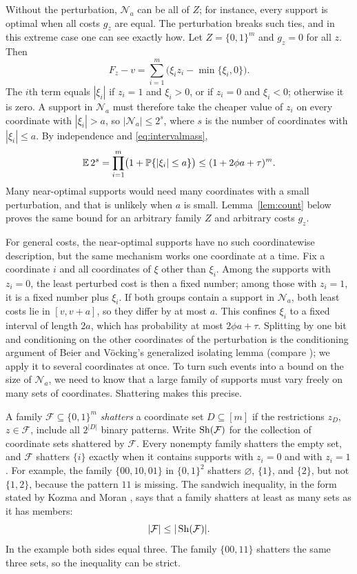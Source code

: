 Without the perturbation, $\mathcal N_a$ can be all of $Z$; for
instance, every support is optimal when all costs $g_z$ are equal. The
perturbation breaks such ties, and in this extreme case one can see
exactly how. Let $Z=\{0,1\}^m$ and $g_z=0$ for all $z$. Then
\[
 F_z-v=\sum_{i=1}^m\bigl(\xi_iz_i-\min\{\xi_i,0\}\bigr).
\]
The $i$th term equals $|\xi_i|$ if $z_i=1$ and $\xi_i>0$, or if $z_i=0$
and $\xi_i<0$; otherwise it is zero. A support in $\mathcal N_a$ must
therefore take the cheaper value of $z_i$ on every coordinate with
$|\xi_i|>a$, so $|\mathcal N_a|\le2^s$, where $s$ is the number of
coordinates with $|\xi_i|\le a$. By independence and
\eqref{eq:intervalmass},
\[
 \mathbb E\,2^s=\prod_{i=1}^m\bigl(1+\mathbb P\{|\xi_i|\le a\}\bigr)
 \le(1+2\phi a+\tau)^m.
\]
Many near-optimal supports would need many coordinates with a small
perturbation, and that is unlikely when $a$ is small.
Lemma~\ref{lem:count} below proves the same bound for an arbitrary
family $Z$ and arbitrary costs $g_z$.

For general costs, the near-optimal supports have no such coordinatewise
description, but the same mechanism works one coordinate at a time. Fix
a coordinate $i$ and all coordinates of $\xi$ other than $\xi_i$. Among
the supports with $z_i=0$, the least perturbed cost is then a fixed
number; among those with $z_i=1$, it is a fixed number plus $\xi_i$. If
both groups contain a support in $\mathcal N_a$, both least costs lie in
$[v,v+a]$, so they differ by at most $a$. This confines $\xi_i$ to a
fixed interval of length $2a$, which has probability at most
$2\phi a+\tau$. Splitting by one bit and conditioning on the other
coordinates of the perturbation is the conditioning argument of Beier
and V\"ocking's generalized isolating lemma
\cite[conference version, Lemma~5]{BeierVocking} (compare
\cite[Lemma~6.1]{RoglinTeng}); we apply it to several coordinates at
once. To turn such events into a bound on the size of $\mathcal N_a$, we
need to know that a large family of supports must vary freely on many
sets of coordinates. Shattering makes this precise.

A family $\mathcal F\subseteq\{0,1\}^m$ \emph{shatters} a coordinate set
$D\subseteq[m]$ if the restrictions $z_D$, $z\in\mathcal F$, include all
$2^{|D|}$ binary patterns. Write $\operatorname{Sh}(\mathcal F)$ for the collection of
coordinate sets shattered by $\mathcal F$. Every nonempty family
shatters the empty set, and $\mathcal F$ shatters $\{i\}$ exactly when
it contains supports with $z_i=0$ and with $z_i=1$. For example, the
family $\{00,10,01\}$ in $\{0,1\}^2$ shatters $\varnothing$, $\{1\}$,
and $\{2\}$, but not $\{1,2\}$, because the pattern $11$ is missing. The
sandwich inequality, in the form stated by Kozma and Moran
\cite[Theorem~5]{KozmaMoran}, says that a family shatters at least as
many sets as it has members:
\begin{equation}\label{eq:sandwich}
 |\mathcal F|\le|\operatorname{Sh}(\mathcal F)|.
\end{equation}
In the example both sides equal three. The family $\{00,11\}$ shatters
the same three sets, so the inequality can be strict.

